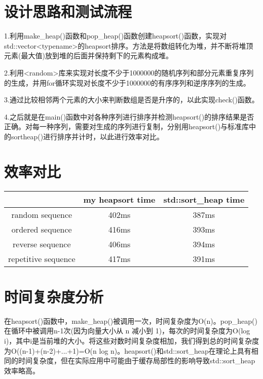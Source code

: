 \documentclass[UTF8]{ctexart}
\begin{document}
\pagestyle{fancy}
\fancyhead{}

\section{设计思路和测试流程}

1.利用make\_heap()函数和pop\_heap()函数创建heapsort()函数，实现对std::vector<typename>的heapsort排序。方法是将数组转化为堆，并不断将堆顶元素(最大值)放到堆的后面并保持剩下的元素构成堆。

2.利用<random>库来实现对长度不少于1000000的随机序列和部分元素重复序列的生成，并用for循环实现对长度不少于1000000的有序序列和逆序序列的生成。

3.通过比较相邻两个元素的大小来判断数组是否是升序的，以此实现check()函数。

4.之后就是在main()函数中对各种序列进行排序并检测heapsort()的排序结果是否正确。对每一种序列，需要对生成的序列进行复制，分别用heapsort()与标准库中的sortheap()进行排序并计时，以此进行效率对比。

\section{效率对比}

\begin{center}
\begin{tabular}{|c|c|c|}
	\hline
	  &  my heapsort time  &  std::sort\_heap time \\ \hline
	random sequence  &  402ms  &  387ms \\ \hline
	ordered sequence  &  416ms  &  393ms \\ \hline
	reverse sequence  &  406ms  &  394ms \\ \hline
	repetitive sequence  &  417ms  &  391ms \\ \hline
\end{tabular}
\end{center}

\section{时间复杂度分析}

在heapsort()函数中，make\_heap()被调用一次，时间复杂度为O(n)。pop\_heap()在循环中被调用n-1次(因为向量大小从 n 减小到 1)，每次的时间复杂度为O(log i)，其中i是当前堆的大小。将这些对数时间复杂度相加，我们得到总的时间复杂度为O((n-1)+(n-2)+...+1)=O(n log n)。heapsort()和std::sort\_heap在理论上具有相同的时间复杂度，但在实际应用中可能由于缓存局部性的影响导致std::sort\_heap效率略高。
\end{document}
